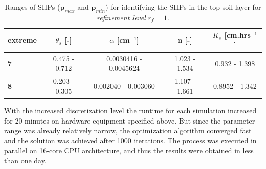 \documentclass[review]{elsarticle}
\renewcommand{\vec}{\mathbf}
\begin{document}
\begin{table}[ht]
\begin{center}
\caption{Ranges of SHPs ($\vec{p}_{max}$ and $\vec{p}_{min}$) for identifying the SHPs in the top-soil layer for {\it refinement level} $r_f=1$. }
\begin{small}
\doublespacing
\begin{tabular}{ l || c c c c }
\toprule
extreme & $\theta_s$ [-]&$\alpha$ [cm$^{-1}$]&n [-]& $K_s$ [cm.hrs$^{-1}$]  \\ \hline
\toprule
{\bf 7} & 0.475 - 0.712 & \num{.0030416} - \num{.0045624} & 1.023 - 1.534 & 0.932 - 1.398 \\
{\bf 8} & 0.203 - 0.305 & \num{.002040} - \num{.003060} & 1.107 - 1.661 & 0.8952 - 1.342  \\
\toprule
\end{tabular}
\end{small}
\label{rozsahy2}
\end{center}
\end{table}

With the increased discretization level the runtime for each simulation increased for 20 minutes on hardware equipment specified above. But since the parameter range was already relatively narrow, the optimization algorithm converged fast and the solution was achieved after 1000 iterations. The process was executed in parallel on 16-core CPU architecture, and thus the results were obtained in less than one day.
\end{document}
